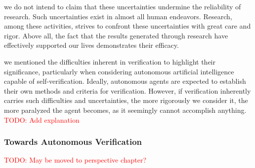 \documentclass{book}
\begin{document}
we do not intend to claim that these uncertainties undermine the reliability of research. Such uncertainties exist in almost all human endeavors. Research, among these activities, strives to confront these uncertainties with great care and rigor. Above all, the fact that the results generated through research have effectively supported our lives demonstrates their efficacy.

we mentioned the difficulties inherent in verification to highlight their significance, particularly when considering autonomous artificial intelligence capable of self-verification. Ideally, autonomous agents are expected to establish their own methods and criteria for verification. However, if verification inherently carries such difficulties and uncertainties, the more rigorously we consider it, the more paralyzed the agent becomes, as it seemingly cannot accomplish anything. \textcolor{red}{TODO: Add explanation}





\subsubsection{Towards Autonomous Verification}
\textcolor{red}{TODO: May be moved to perspective chapter?}
\end{document}
